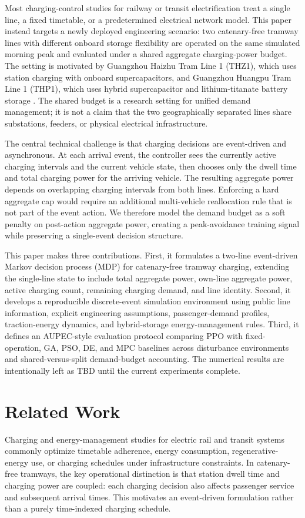 \documentclass[conference]{IEEEtran}
\newcommand{\thz}{THZ1}
\newcommand{\thp}{THP1}
\begin{document}
Most charging-control studies for railway or transit electrification treat a single line, a fixed timetable, or a predetermined electrical network model. This paper instead targets a newly deployed engineering scenario: two catenary-free tramway lines with different onboard storage flexibility are operated on the same simulated morning peak and evaluated under a shared aggregate charging-power budget. The setting is motivated by Guangzhou Haizhu Tram Line 1 (\thz), which uses station charging with onboard supercapacitors, and Guangzhou Huangpu Tram Line 1 (\thp), which uses hybrid supercapacitor and lithium-titanate battery storage \cite{haizhu_wiki,haizhu_baike,huangpu_wiki,huangpu_sasac}. The shared budget is a research setting for unified demand management; it is not a claim that the two geographically separated lines share substations, feeders, or physical electrical infrastructure.

The central technical challenge is that charging decisions are event-driven and asynchronous. At each arrival event, the controller sees the currently active charging intervals and the current vehicle state, then chooses only the dwell time and total charging power for the arriving vehicle. The resulting aggregate power depends on overlapping charging intervals from both lines. Enforcing a hard aggregate cap would require an additional multi-vehicle reallocation rule that is not part of the event action. We therefore model the demand budget as a soft penalty on post-action aggregate power, creating a peak-avoidance training signal while preserving a single-event decision structure.

This paper makes three contributions. First, it formulates a two-line event-driven Markov decision process (MDP) for catenary-free tramway charging, extending the single-line state to include total aggregate power, own-line aggregate power, active charging count, remaining charging demand, and line identity. Second, it develops a reproducible discrete-event simulation environment using public line information, explicit engineering assumptions, passenger-demand profiles, traction-energy dynamics, and hybrid-storage energy-management rules. Third, it defines an AUPEC-style evaluation protocol comparing PPO with fixed-operation, GA, PSO, DE, and MPC baselines across disturbance environments and shared-versus-split demand-budget accounting. The numerical results are intentionally left as TBD until the current experiments complete.

\section{Related Work}
Charging and energy-management studies for electric rail and transit systems commonly optimize timetable adherence, energy consumption, regenerative-energy use, or charging schedules under infrastructure constraints. In catenary-free tramways, the key operational distinction is that station dwell time and charging power are coupled: each charging decision also affects passenger service and subsequent arrival times. This motivates an event-driven formulation rather than a purely time-indexed charging schedule.
\end{document}
